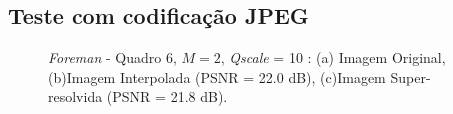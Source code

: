 \subsection{Teste com codificação JPEG}
\begin{figure}[H]
    \centering
    \qquad
	\qquad

    \caption{\textit{Foreman} - Quadro 6, $M = 2$, \textit{Qscale} = 10 : (a) Imagem Original, (b)Imagem Interpolada (PSNR = 22.0 dB), (c)Imagem Super-resolvida (PSNR = 21.8 dB).}
	    
    \label{fig:1}
\end{figure}

